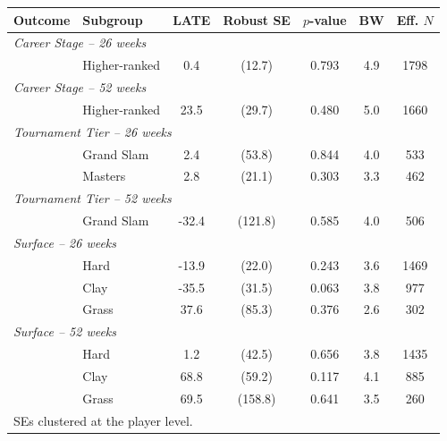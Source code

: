 \begin{tabular}{llccccc}
\toprule
Outcome & Subgroup & LATE & Robust SE & $p$-value & BW & Eff. $N$ \\
\midrule
\multicolumn{7}{l}{\textit{Career Stage -- 26 weeks}} \\
 & Higher-ranked & 0.4 & (12.7) & 0.793 & 4.9 & 1798 \\
\multicolumn{7}{l}{\textit{Career Stage -- 52 weeks}} \\
 & Higher-ranked & 23.5 & (29.7) & 0.480 & 5.0 & 1660 \\
\multicolumn{7}{l}{\textit{Tournament Tier -- 26 weeks}} \\
 & Grand Slam & 2.4 & (53.8) & 0.844 & 4.0 & 533 \\
 & Masters & 2.8 & (21.1) & 0.303 & 3.3 & 462 \\
\multicolumn{7}{l}{\textit{Tournament Tier -- 52 weeks}} \\
 & Grand Slam & -32.4 & (121.8) & 0.585 & 4.0 & 506 \\
\multicolumn{7}{l}{\textit{Surface -- 26 weeks}} \\
 & Hard & -13.9 & (22.0) & 0.243 & 3.6 & 1469 \\
 & Clay & -35.5 & (31.5) & 0.063 & 3.8 & 977 \\
 & Grass & 37.6 & (85.3) & 0.376 & 2.6 & 302 \\
\multicolumn{7}{l}{\textit{Surface -- 52 weeks}} \\
 & Hard & 1.2 & (42.5) & 0.656 & 3.8 & 1435 \\
 & Clay & 68.8 & (59.2) & 0.117 & 4.1 & 885 \\
 & Grass & 69.5 & (158.8) & 0.641 & 3.5 & 260 \\
\midrule
\multicolumn{7}{l}{\footnotesize SEs clustered at the player level.} \\
\bottomrule
\end{tabular}
